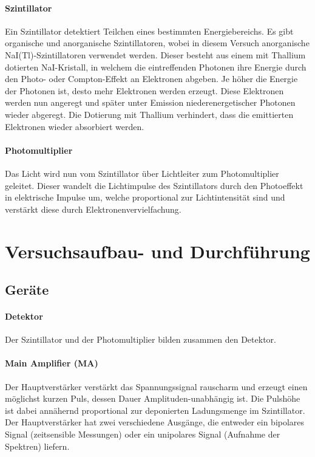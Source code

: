 \documentclass[12pt]{article}
\begin{document}
 \paragraph{Szintillator} Ein Szintillator detektiert Teilchen eines bestimmten Energiebereichs. Es gibt organische und anorganische Szintillatoren, wobei in diesem Versuch anorganische NaI(Tl)-Szintillatoren verwendet werden. Dieser besteht aus einem mit Thallium dotierten NaI-Kristall, in welchem die eintreffenden Photonen ihre Energie durch den Photo- oder Compton-Effekt an Elektronen abgeben. Je höher die Energie der Photonen ist, desto mehr Elektronen werden erzeugt. Diese Elektronen werden nun angeregt und später unter Emission  niederenergetischer Photonen wieder abgeregt. Die Dotierung mit Thallium verhindert, dass die emittierten Elektronen wieder absorbiert werden.
 \paragraph{Photomultiplier}
 Das Licht wird nun vom Szintillator über Lichtleiter zum Photomultiplier geleitet. Dieser wandelt die Lichtimpulse des Szintillators durch den Photoeffekt in elektrische Impulse um, welche proportional zur Lichtintensität sind und verstärkt diese durch Elektronenvervielfachung.
 

 
\newpage
\section[Versuchsaufbau- und Durchführung]{Versuchsaufbau- und Durchführung \cite{anleitung}}
\subsection{Geräte}
\paragraph{Detektor} Der Szintillator und der Photomultiplier bilden zusammen den Detektor.
\paragraph{Main Amplifier (MA)}
Der Hauptverstärker  verstärkt das Spannungssignal rauscharm und erzeugt einen möglichst kurzen Puls, dessen Dauer Amplituden-unabhängig ist. Die Pulshöhe ist dabei annähernd proportional zur deponierten Ladungsmenge im Szintillator. Der Hauptverstärker hat zwei verschiedene Ausgänge, die entweder ein bipolares Signal (zeitsensible Messungen) oder ein unipolares Signal (Aufnahme der Spektren) liefern.
\end{document}
